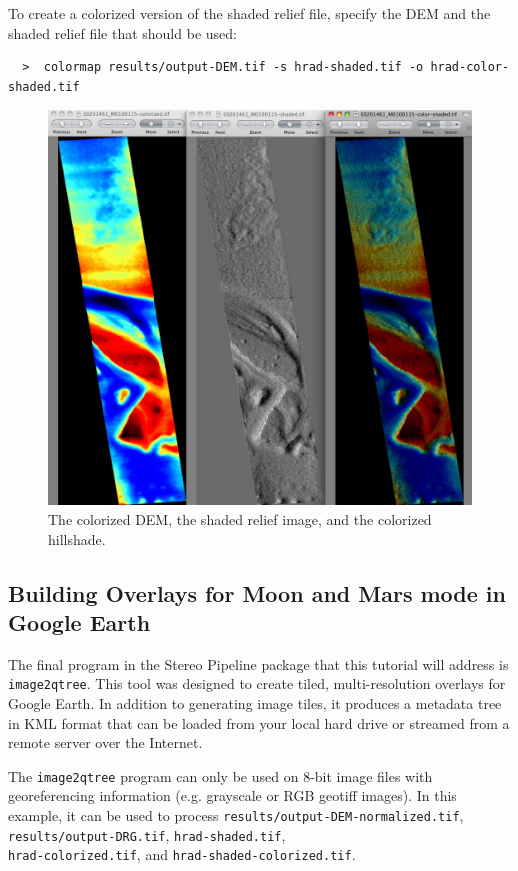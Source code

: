 To create a colorized version of the shaded relief file, specify
the \ac{DEM} and the shaded relief file that should be used:

\begin{verbatim}
  >  colormap results/output-DEM.tif -s hrad-shaded.tif -o hrad-color-shaded.tif
\end{verbatim}

\begin{figure}[b!]
\begin{center}
\includegraphics[width=4.7in]{images/p19-colorized-shaded.png}
\caption[Hrad colorized and shaded relief]{
    \label{hrad-color}
	The colorized DEM, the shaded relief image, and the colorized hillshade.
    }
\end{center}
\end{figure}

\subsection{Building Overlays for Moon and Mars mode in Google Earth}

The final program in the Stereo Pipeline package that this tutorial
will address is \texttt{image2qtree}.  This tool was designed to
create tiled, multi-resolution overlays for Google Earth.  In addition
to generating image tiles, it produces a metadata tree in KML format
that can be loaded from your local hard drive or streamed from a
remote server over the Internet.

The \texttt{image2qtree} program can only be used on 8-bit image files
with georeferencing information (e.g. grayscale or RGB geotiff
images). In this example, it can be used to process 
\texttt{results/output-DEM-normalized.tif},
\texttt{results/output-DRG.tif}, \texttt{hrad-shaded.tif}, \\
\texttt{hrad-colorized.tif}, and \texttt{hrad-shaded-colorized.tif}.

